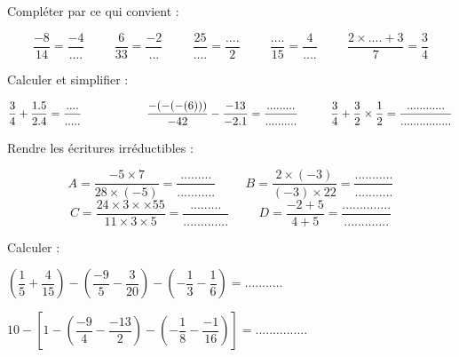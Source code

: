 \documentclass[a4paper,addpoints,12pt]{exam}
\begin{document}
\devoir[prv=false,ds=false,num=1 ,niv=2 ,date=14/10/2022,Rdate=31/10/2023]

\begin{exo}
\begin{questions}
\question Compléter par ce qui convient :
\end{questions}
\[\dfrac{-8}{14}=\dfrac{-4}{....} \hspace{1cm}
\dfrac{6}{33}=\dfrac{-2}{...}\hspace{1cm}
\dfrac{25}{....}=\dfrac{....}{2} \hspace{1cm}
\dfrac{....}{15}=\dfrac{4}{....}\hspace{1cm}
\dfrac{2\times .... +3}{7}=\dfrac{3}{4}\]

\end{exo}

\begin{exo}
\begin{questions}
\question Calculer et simplifier :
\end{questions}
$\dfrac{3}{4}+\dfrac{1.5}{2.4}=\dfrac{....}{.....}\hspace{2cm}
\dfrac{-(-(-(6)))}{-42}-\dfrac{-13}{-2.1}=\dfrac{.........}{..........}\hspace*{1cm} \dfrac{3}{4}+\dfrac{3}{2}\times \dfrac{1}{2}=\dfrac{............}{................}$
\end{exo}


\begin{exo}
\begin{questions}
\question Rendre les écritures irréductibles :
\end{questions}
\[A=\dfrac{-5\times7}{28\times(-5)} =\dfrac{.........}{...........}\hspace{1cm}
B=\dfrac{2\times(-3)}{(-3)\times22}=\dfrac{...........}{...........}\]
\[C=\dfrac{24\times3\times\times55}{11\times3\times5}=\dfrac{.........}{.............} \hspace{1cm}
D=\dfrac{-2+5}{4+5}=\dfrac{..............}{.............}\]
\end{exo}

\begin{exo}
\begin{questions}
\question Calculer :
\end{questions}
$\left( \dfrac{1}{5}+\dfrac{4}{15}\right) -\left( \dfrac{-9}{5}-\dfrac{3}{20}\right) -\left( -\dfrac{1}{3}-\dfrac{1}{6} \right) = ........... $

$ 10 -\left[ 1-\left( \dfrac{-9}{4}-\dfrac{-13}{2}\right) -\left( -\dfrac{1}{8}-\dfrac{-1}{16} \right)\right]= ............... $

\end{exo}
\end{document}
